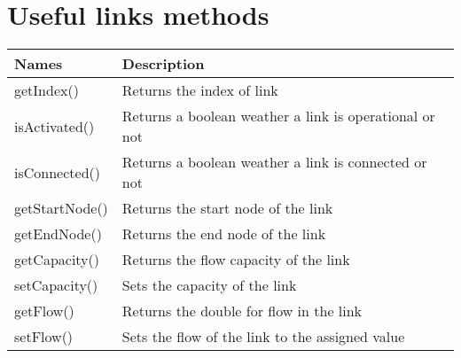 \documentclass[11pt,fleqn]{book} %
\begin{document}
\section{Useful links methods}\label{sec:link_methods}
\begin{table}[!ht]
\centering
\begin{tabular}{| p{7cm} | p{9cm} |}
\hline
\rowcolor{Gray}
Names & Description \\
\hline
getIndex() &  Returns the index of link\\
\hline
isActivated() & Returns a boolean weather a link is operational or not \\
\hline
isConnected() & Returns a boolean weather a link is connected or not \\
\hline
getStartNode() & Returns the start node of the link \\
\hline
getEndNode() & Returns the end node of the link \\
\hline
getCapacity() & Returns the flow capacity of the link \\
\hline
setCapacity() & Sets the capacity of the link \\
\hline
getFlow() & Returns the double for flow in the link \\
\hline
setFlow() & Sets the flow of the link to the assigned value \\
\hline
\end{tabular}
\end{table}
%
%
%
%
%
%
\end{document}
